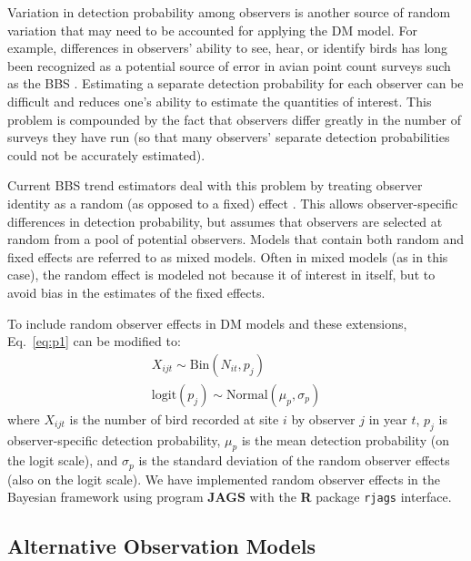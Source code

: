 \documentclass[12pt]{article}
\begin{document}
Variation in detection probability among observers is another source
of random variation that may need to be accounted for applying the DM
model. For example, differences in observers' ability to see, hear, or identify
birds has long been recognized as a potential source of error
in avian point count surveys such as the BBS
\citep{robbins_etal:1986,diefenbach_etal:2003,sauer_etal:1994auk,alldredge_etal:2007auk,campbell_francis:2011}.
Estimating a separate detection probability for each observer can be
difficult and reduces one's ability to estimate the quantities
of interest.  This problem is compounded by the fact that
observers differ greatly in the number of surveys they have
run (so that many observers' separate detection probabilities
could not be accurately estimated).

Current BBS trend estimators deal with this problem by
treating observer identity as a random (as opposed to a fixed)
effect \citep{link_sauer:2002,sauer_link:2011}.
This allows observer-specific differences in detection probability,
but assumes that observers are selected at random from a pool
of potential observers.  Models that contain both random and
fixed effects are referred to as mixed models.  Often in mixed
models (as in this case), the random effect is modeled not
because it of interest in itself, but to avoid bias in the
estimates of the fixed effects.

To include random observer effects in DM models and these extensions,
Eq.~\ref{eq:p1} can be modified to:
\begin{gather}
X_{ijt} \sim \mathrm{Bin}(N_{it}, p_j) \nonumber \\
\mathrm{logit}(p_j) \sim \mathrm{Normal}(\mu_p, \sigma_p)
\label{eq:pobs}
\end{gather}
where $X_{ijt}$ is the number of bird recorded at site $i$ by observer $j$ in
year $t$, $p_j$ is observer-specific detection probability, $\mu_p$ is the mean
detection probability (on the logit scale), and $\sigma_p$ is the standard
deviation of the random observer effects (also on the logit scale).
We have implemented random observer effects in the Bayesian framework
using program \textbf{JAGS} \citep[version 3.2.0]{plummer:2003}
with the \textbf{R} package \texttt{rjags} \citep{plummer:2011, R-2012}
interface.


\subsection{Alternative Observation Models}
\end{document}
